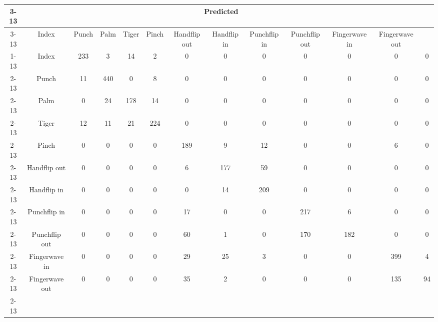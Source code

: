\documentclass{standalone}
\begin{document}
 
 \begin{tabular}{|c |c |c |c |c |c |c |c |c |c |c |c |c |}
\cline{3-13}\multicolumn{2}{c|}{} & \multicolumn{11}{c|}{Predicted} \\ 
\cline{3-13} \multicolumn{2}{c |}{ } & Index & Punch & Palm & Tiger & Pinch & Handflip out & Handflip in & Punchflip in & Punchflip out & Fingerwave in & Fingerwave out\\ 
\cline{1-13}\multirow{11}{*}{\rotatebox[origin=c]{90}{Actual}} & Index & 233 & 3 & 14 & 2 & 0 & 0 & 0 & 0 & 0 & 0 & 0\\ 
 \cline{2-13} & Punch & 11 & 440 & 0 & 8 & 0 & 0 & 0 & 0 & 0 & 0 & 0\\ 
 \cline{2-13} & Palm & 0 & 24 & 178 & 14 & 0 & 0 & 0 & 0 & 0 & 0 & 0\\ 
 \cline{2-13} & Tiger & 12 & 11 & 21 & 224 & 0 & 0 & 0 & 0 & 0 & 0 & 0\\ 
 \cline{2-13} & Pinch & 0 & 0 & 0 & 0 & 189 & 9 & 12 & 0 & 0 & 6 & 0\\ 
 \cline{2-13} & Handflip out & 0 & 0 & 0 & 0 & 6 & 177 & 59 & 0 & 0 & 0 & 0\\ 
 \cline{2-13} & Handflip in & 0 & 0 & 0 & 0 & 0 & 14 & 209 & 0 & 0 & 0 & 0\\ 
 \cline{2-13} & Punchflip in & 0 & 0 & 0 & 0 & 17 & 0 & 0 & 217 & 6 & 0 & 0\\ 
 \cline{2-13} & Punchflip out & 0 & 0 & 0 & 0 & 60 & 1 & 0 & 170 & 182 & 0 & 0\\ 
 \cline{2-13} & Fingerwave in & 0 & 0 & 0 & 0 & 29 & 25 & 3 & 0 & 0 & 399 & 4\\ 
 \cline{2-13} & Fingerwave out & 0 & 0 & 0 & 0 & 35 & 2 & 0 & 0 & 0 & 135 & 94\\ 
 \cline{2-13}\hline \end{tabular}
 
\end{document}
